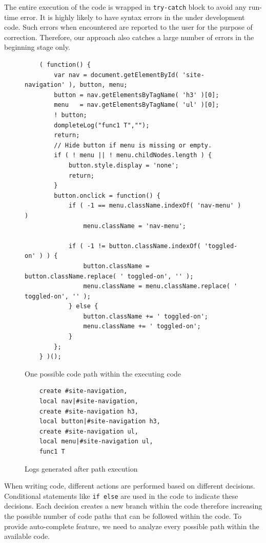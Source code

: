 		The entire execution of the code is wrapped in \texttt{try-catch} block to avoid any run-time error. It is highly likely to have syntax errors in the under development code. Such errors when encountered are reported to the user for the purpose of correction. Therefore, our approach also catches a large number of errors in the beginning stage only.
		
		
		\begin{figure}
			\medskip
			\begin{lstlisting}
	( function() {
		var nav = document.getElementById( 'site-navigation' ), button, menu;
		button = nav.getElementsByTagName( 'h3' )[0];
		menu   = nav.getElementsByTagName( 'ul' )[0];
		! button;
		dompleteLog("func1 T","");
		return;
		// Hide button if menu is missing or empty.
		if ( ! menu || ! menu.childNodes.length ) {
			button.style.display = 'none';
			return;
		}
		button.onclick = function() {
			if ( -1 == menu.className.indexOf( 'nav-menu' ) )
				menu.className = 'nav-menu';

			if ( -1 != button.className.indexOf( 'toggled-on' ) ) {	
				button.className = button.className.replace( ' toggled-on', '' );
				menu.className = menu.className.replace( ' toggled-on', '' );
			} else {
				button.className += ' toggled-on';
				menu.className += ' toggled-on';
			}
		};
	} )();
			\end{lstlisting}
			\caption{One possible code path within the executing code}
			\label{Fig:Path}
			\end{figure}
			
			
			\begin{figure}
			\medskip
			\begin{lstlisting}
	create #site-navigation, 
	local nav|#site-navigation, 
	create #site-navigation h3, 
	local button|#site-navigation h3, 
	create #site-navigation ul, 
	local menu|#site-navigation ul, 
	func1 T 
			\end{lstlisting}
			\caption{Logs generated after path execution}
			\label{Fig:Logs}
			\end{figure}
			
		
		When writing code, different actions are performed based on different decisions. Conditional statements like \texttt{if else} are used in the code to indicate these decisions. Each decision creates a new branch within the code therefore increasing the possible number of code paths that can be followed within the code. To provide auto-complete feature, we need to analyze every possible path within the available \javascript code.
		

